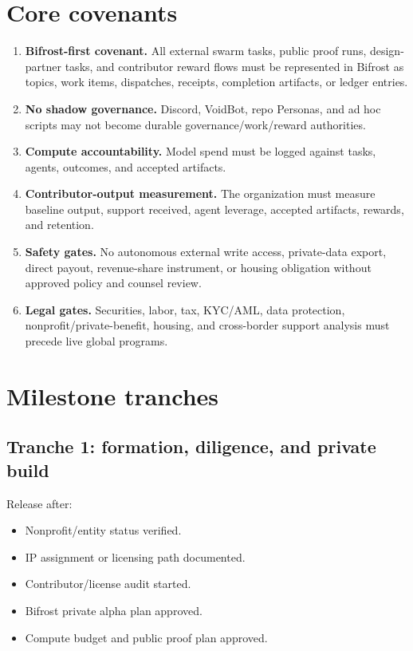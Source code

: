 \documentclass[11pt,oneside]{report}
\newcommand{\term}[1]{\textbf{#1}}
\begin{document}
\section{Core covenants}

\begin{enumerate}
  \item \term{Bifrost-first covenant.} All external swarm tasks, public proof runs, design-partner tasks, and contributor reward flows must be represented in Bifrost as topics, work items, dispatches, receipts, completion artifacts, or ledger entries.
  \item \term{No shadow governance.} Discord, VoidBot, repo Personas, and ad hoc scripts may not become durable governance/work/reward authorities.
  \item \term{Compute accountability.} Model spend must be logged against tasks, agents, outcomes, and accepted artifacts.
  \item \term{Contributor-output measurement.} The organization must measure baseline output, support received, agent leverage, accepted artifacts, rewards, and retention.
  \item \term{Safety gates.} No autonomous external write access, private-data export, direct payout, revenue-share instrument, or housing obligation without approved policy and counsel review.
  \item \term{Legal gates.} Securities, labor, tax, KYC/AML, data protection, nonprofit/private-benefit, housing, and cross-border support analysis must precede live global programs.
\end{enumerate}

\section{Milestone tranches}

\subsection{Tranche 1: formation, diligence, and private build}

Release after:

\begin{itemize}
  \item Nonprofit/entity status verified.
  \item IP assignment or licensing path documented.
  \item Contributor/license audit started.
  \item Bifrost private alpha plan approved.
  \item Compute budget and public proof plan approved.
\end{itemize}
\end{document}
